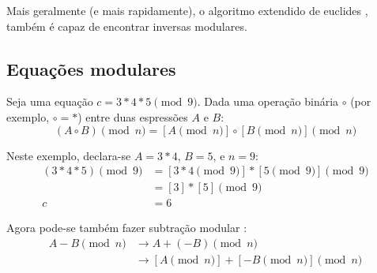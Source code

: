 \iffalse

The modular multiplicative inverse has a rule stating:\\
{\em If $a c \equiv b \pmod{n}$ with $a$ and $n$ relatively prime, the solution to this linear congruence is given by \(c = a^{-1} b \pmod{n}\).}\cite{wiki-modular-arithmetic}\\
It means we can do $c = a^{-1} b \pmod n \rightarrow ca \equiv b \pmod n \rightarrow a \equiv c^{-1} b \pmod n$.}\vspace{.175cm}
\begin{align*} 
    a^{n-1} &\equiv 1 \pmod{n} \\
    a*a^{n-2} &\equiv 1 \pmod{n} \\
    c \equiv a^{n-2} &\equiv a^{-1} \pmod{n}
\end{align*}

\fi

Mais geralmente (e mais rapidamente), o algoritmo extendido de euclides \cite{extended-euclidean}, também é capaz de encontrar inversas modulares.


\subsection{Equações modulares}
\label{subsec:modular-equations}

Seja uma equação $c = 3*4*5 \pmod 9$. Dada uma operação binária $\circ$ (por exemplo, $\circ = *$) entre duas espressões $A$ e $B$:\vspace{.175cm} 
\[(A \circ B)\pmod{n} = {[A\pmod {n}] \circ [B\pmod{n}]}\pmod{n}\]

Neste exemplo, declara-se $A = 3*4$, $B = 5$, e $n = 9$:\vspace{.175cm}
\begin{align*}
(3*4 * 5) \pmod{9} &= {[3*4 \pmod {9}] * [5 \pmod{9}]} \pmod{9} \\
				   &= [3]*[5] \pmod 9 \\
				 c &= 6
\end{align*}

Agora pode-se também fazer subtração modular : \vspace{.175cm}
\begin{align*}
A - B \pmod n &\rightarrow A + (-B) \pmod n \\
			  &\rightarrow {[A \pmod {n}] + [-B \pmod{n}]} \pmod{n}
\end{align*}\\

